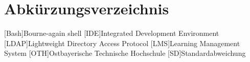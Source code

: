 \section*{Abkürzungsverzeichnis} 

\begin{acronym}[Bash]
    [Bash]{Bourne-again shell}
    [IDE]{Integrated Development Environment}
    [LDAP]{Lightweight Directory Access Protocol}
    [LMS]{Learning Management System}
    [OTH]{Ostbayerische Technische Hochschule}
    [SD]{Standardabweichung}
\end{acronym}